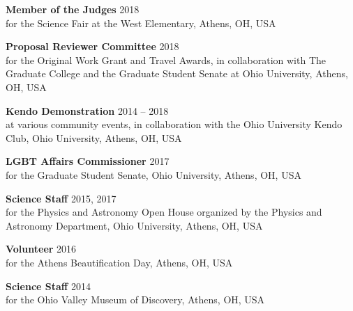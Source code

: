 \documentclass{article}
\begin{document}
\textbf{Member of the Judges} \hfill 2018\\
for the Science Fair at the West Elementary, Athens, OH, USA

\textbf{Proposal Reviewer Committee} \hfill 2018\\
for the Original Work Grant and Travel Awards, in collaboration with The Graduate College and the Graduate Student Senate at Ohio University, Athens, OH, USA

\textbf{Kendo Demonstration} \hfill 2014 -- 2018\\
at various community events, in collaboration with the Ohio University Kendo Club, Ohio University, Athens, OH, USA

\textbf{LGBT Affairs Commissioner} \hfill 2017\\
for the Graduate Student Senate, Ohio University, Athens, OH, USA

\textbf{Science Staff} \hfill 2015, 2017\\
for the Physics and Astronomy Open House organized by the Physics and Astronomy Department, Ohio University, Athens, OH, USA

\textbf{Volunteer} \hfill 2016\\
for the Athens Beautification Day, Athens, OH, USA

\textbf{Science Staff} \hfill 2014\\
for the Ohio Valley Museum of Discovery, Athens, OH, USA
\end{document}

